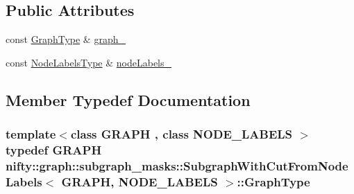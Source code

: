 \subsection*{Public Attributes}
\begin{DoxyCompactItemize}
\item 
const \hyperlink{structnifty_1_1graph_1_1subgraph__masks_1_1SubgraphWithCutFromNodeLabels_adc4d7dd452a818984b5afc989cc55a19}{Graph\+Type} \& \hyperlink{structnifty_1_1graph_1_1subgraph__masks_1_1SubgraphWithCutFromNodeLabels_a1c05f51c94a45c331bfc87c01c14945f}{graph\+\_\+}
\item 
const \hyperlink{structnifty_1_1graph_1_1subgraph__masks_1_1SubgraphWithCutFromNodeLabels_aab0ef05152a0058c18c020c8220ad30f}{Node\+Labels\+Type} \& \hyperlink{structnifty_1_1graph_1_1subgraph__masks_1_1SubgraphWithCutFromNodeLabels_ad5ab9c0ccfb9b5e654f60f1389df11af}{node\+Labels\+\_\+}
\end{DoxyCompactItemize}


\subsection{Member Typedef Documentation}
\hypertarget{structnifty_1_1graph_1_1subgraph__masks_1_1SubgraphWithCutFromNodeLabels_adc4d7dd452a818984b5afc989cc55a19}{}
\subsubsection[{Graph\+Type}]{\setlength{\rightskip}{0pt plus 5cm}template$<$class G\+R\+A\+P\+H , class N\+O\+D\+E\+\_\+\+L\+A\+B\+E\+L\+S $>$ typedef G\+R\+A\+P\+H {\bf nifty\+::graph\+::subgraph\+\_\+masks\+::\+Subgraph\+With\+Cut\+From\+Node\+Labels}$<$ G\+R\+A\+P\+H, N\+O\+D\+E\+\_\+\+L\+A\+B\+E\+L\+S $>$\+::{\bf Graph\+Type}}\label{structnifty_1_1graph_1_1subgraph__masks_1_1SubgraphWithCutFromNodeLabels_adc4d7dd452a818984b5afc989cc55a19}
\hypertarget{structnifty_1_1graph_1_1subgraph__masks_1_1SubgraphWithCutFromNodeLabels_aab0ef05152a0058c18c020c8220ad30f}{}
